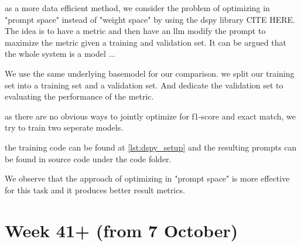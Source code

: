 \documentclass[11pt]{article}
\begin{document}
as a more data efficient method, we consider the problem of optimizing in "prompt space" instead of "weight space" by using the dspy library CITE HERE. 
The idea is to have a metric and then have an llm modify the prompt to maximize the metric given a training and validation set. 
It can be argued that the whole system is a model ... 

We use the same underlying basemodel for our comparison.
we split our training set into a training set and a validation set. 
And dedicate the validation set to evaluating the performance of the metric.

as there are no obvious ways to jointly optimize for f1-score and exact match, we try to train two seperate models.

the training code can be found at \ref{lst:dspy_setup} and the resulting prompts can be found in source code under the code folder.


\begin{table}[ht]
    \centering
    \caption{Performance comparison of F1 Score and Exact Match optimized models for QA on 'answer\_inlang' field}
    \label{tab:prompt_optimized_week40_performance}
\end{table}

We observe that the approach of optimizing in "prompt space" is more effective for this task and it produces better result metrics.

\section{Week 41+ (from 7 October)}
\label{sec:week41}
\end{document}
